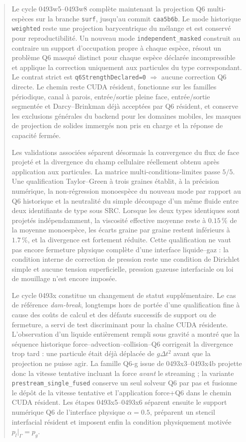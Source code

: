 \documentclass[11pt,a4paper]{article}
\begin{document}
\begin{abstract}
Le cycle 0493w5--0493w8 complète maintenant la projection Q6 multi-espèces sur la branche \texttt{surf}, jusqu'au commit \texttt{caa5b6b}. Le mode historique \texttt{weighted} reste une projection barycentrique du mélange et est conservé pour reproductibilité. Un nouveau mode \texttt{independent\_masked} construit au contraire un support d'occupation propre à chaque espèce, résout un problème Q6 masqué distinct pour chaque espèce déclarée incompressible et applique la correction uniquement aux particules du type correspondant. Le contrat strict est \texttt{q6StrengthDeclared=0} $\Rightarrow$ aucune correction Q6 directe. Le chemin reste CUDA résident, fonctionne sur les familles périodique, canal à parois, entrée/sortie pleine face, entrée/sortie segmentée et Darcy--Brinkman déjà acceptées par Q6 résident, et conserve les exclusions générales du backend pour les domaines mobiles, les masques de projection de solides immergés non pris en charge et la réponse de capacité fermée.

Les validations associées séparent désormais la convergence du flux de face projeté et la divergence du champ cellulaire réellement obtenu après application aux particules. La matrice multi-conditions-limites passe $5/5$. Une qualification Taylor--Green à trois graines établit, à la précision numérique, la non-régression monoespèce du nouveau mode par rapport au Q6 historique et la neutralité du simple découpage d'un même fluide entre deux identifiants de type sous SRC. Lorsque les deux types identiques sont projetés indépendamment, la viscosité effective moyenne reste à $0.15\,\%$ de la moyenne monoespèce, les écarts graine par graine restent inférieurs à $1.7\,\%$, et la divergence est fortement réduite. Cette qualification ne vaut pas encore fermeture physique complète d'une interface liquide--gaz : la condition interne de correction de pression reste une condition de Dirichlet simple et aucune tension superficielle, pression gazeuse interfaciale ou loi de mouillage n'est encore imposée.


Le cycle 0493x constitue un changement de statut supplémentaire. Le cas de référence
\emph{dam-break}, longtemps hors de portée d'une qualification fine à cause des coûts de calcul et des défauts successifs de support ou de fermeture, a servi de test discriminant pour la chaîne CUDA résidente. L'observation d'un liquide entièrement rempli sous gravité a montré que la séquence historique force--advection--collision--Q6 corrigeait la divergence trop tard : une particule était déjà déplacée de $g\Delta t^2$ avant que la projection ne puisse agir. La famille Q6-g issue de 0493x3--0493x4b projette donc la vitesse tentative incluant la force \emph{avant} le streaming ; la variante \texttt{prestream\_single\_fused} conserve un seul solveur Q6 par pas et fusionne le dépôt de la vitesse tentative et l'application force+Q6 dans le chemin CUDA résident. Les étapes 0493x5--0493x6 séparent ensuite le support numérique Q6 de l'interface physique $\alpha=0.5$, préparent un stencil interfacial résident et imposent enfin la condition physiquement motivée $p_l|_\Gamma=p_g$.


\end{abstract}
\end{document}
